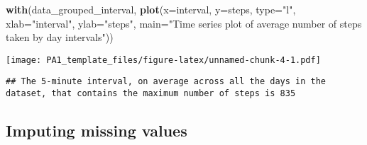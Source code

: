 \documentclass[
]{article}
\newenvironment{Shaded}{\begin{snugshade}}{\end{snugshade}}
\newcommand{\AttributeTok}[1]{\textcolor[rgb]{0.13,0.29,0.53}{#1}}
\newcommand{\CommentTok}[1]{\textcolor[rgb]{0.56,0.35,0.01}{\textit{#1}}}
\newcommand{\FunctionTok}[1]{\textcolor[rgb]{0.13,0.29,0.53}{\textbf{#1}}}
\newcommand{\NormalTok}[1]{#1}
\newcommand{\OtherTok}[1]{\textcolor[rgb]{0.56,0.35,0.01}{#1}}
\newcommand{\SpecialCharTok}[1]{\textcolor[rgb]{0.81,0.36,0.00}{\textbf{#1}}}
\newcommand{\StringTok}[1]{\textcolor[rgb]{0.31,0.60,0.02}{#1}}
\begin{document}
\begin{Shaded}
\begin{Highlighting}[]
\FunctionTok{with}\NormalTok{(data\_grouped\_interval, }\FunctionTok{plot}\NormalTok{(}\AttributeTok{x=}\NormalTok{interval, }\AttributeTok{y=}\NormalTok{steps, }\AttributeTok{type=}\StringTok{"l"}\NormalTok{, }\AttributeTok{xlab=}\StringTok{"interval"}\NormalTok{, }\AttributeTok{ylab=}\StringTok{"steps"}\NormalTok{, }\AttributeTok{main=}\StringTok{"Time series plot of average number of steps taken by day intervals"}\NormalTok{))}
\end{Highlighting}
\end{Shaded}

\texttt{[image: PA1\_template\_files/figure-latex/unnamed-chunk-4-1.pdf]}

\begin{Shaded}
\end{Shaded}

\begin{verbatim}
## The 5-minute interval, on average across all the days in the dataset, that contains the maximum number of steps is 835
\end{verbatim}

\hypertarget{imputing-missing-values}{%
\subsection{Imputing missing values}\label{imputing-missing-values}}

\begin{Shaded}
\end{Shaded}
\end{document}
